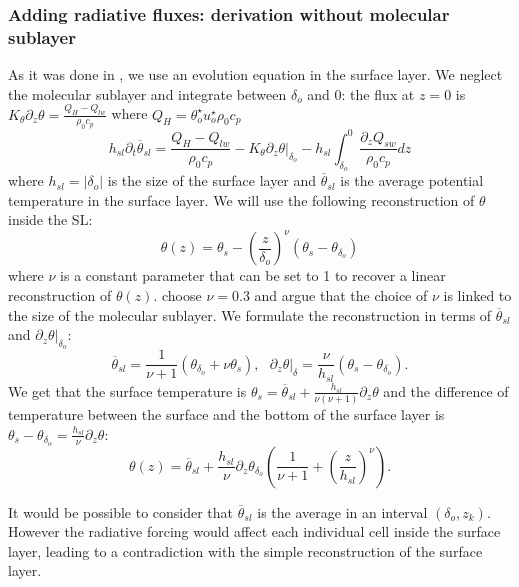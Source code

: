 \subsubsection{Adding radiative fluxes: derivation without
molecular sublayer}
As it was done in 
\citep{zeng_prognostic_2005}, we use an evolution equation
in the surface layer. We neglect the molecular sublayer and
integrate between $\delta_o$ and 0:
the flux at $z=0$ is
$K_\theta \partial_z \theta = \frac{Q_H - Q_{lw}}{\rho_0 c_p}$
where $Q_H = \theta_o^\star u_o^\star \rho_0 c_p$
\begin{equation}
\label{eq:evolEqOSL}
h_{sl}\partial_t \overline{\theta}_{sl} =
\frac{Q_H - Q_{lw}}{\rho_0 c_p}
- \left. K_\theta \partial_z \theta 
\right|_{\delta_{o}}
- h_{sl}\int_{\delta_o}^0
\frac{\partial_z Q_{sw}}{\rho_0 c_p} dz
\end{equation}
where $h_{sl} = |\delta_o|$
is the size of the surface layer and
$\overline{\theta}_{sl}$ is the average potential
temperature in the surface layer.
We will use the following reconstruction of $\theta$
inside the SL:
\begin{equation}
    \theta(z) = \theta_s -
    \left(\frac{z}{\delta_{o}}\right)^\nu \left( \theta_s - 
    \theta_{\delta_o}\right)
\end{equation}
where $\nu$ is a constant parameter that can be set to 1 to
recover a linear reconstruction of $\theta(z)$.
\cite{zeng_prognostic_2005} choose $\nu=0.3$ and argue that
the choice of $\nu$ is linked to the size of the molecular
sublayer.
We formulate the reconstruction in terms of $\overline{\theta}_{sl}$
and $\left.\partial_z \theta\right|_{\delta_o}$:
\begin{equation}
    \overline{\theta}_{sl} = \frac{1}{\nu+1}
    (\theta_{\delta_o} + \nu \theta_s)
, ~~~ \left.\partial_z \theta \right|_\delta
= \frac{\nu}{h_{sl}} (\theta_s - \theta_{\delta_o}).
\end{equation}
We get that the surface temperature
is $\theta_s = \overline{\theta}_{sl}
+ \frac{h_{sl}}{\nu(\nu+1)} \partial_z \theta$ and
the difference of temperature between
the surface and the bottom of the surface layer is
$\theta_s - \theta_{\delta_o} = 
\frac{h_{sl}}{\nu}\partial_z \theta$:
\begin{equation}
    \theta(z) = \overline{\theta}_{sl} +
    \frac{h_{sl}}{\nu} \partial_z \theta_{\delta_o} \left(
    \frac{1}{\nu+1} + \left(\frac{z}{h_{sl}}\right)^\nu
\right).
\end{equation}
\begin{remark}
It would be possible to consider that $\overline{\theta}_{sl}$ is
the average in an interval $(\delta_o, z_k)$.
However the radiative forcing would affect each individual cell
inside the surface layer, leading to a contradiction with the simple
reconstruction of the surface layer.
\end{remark}
